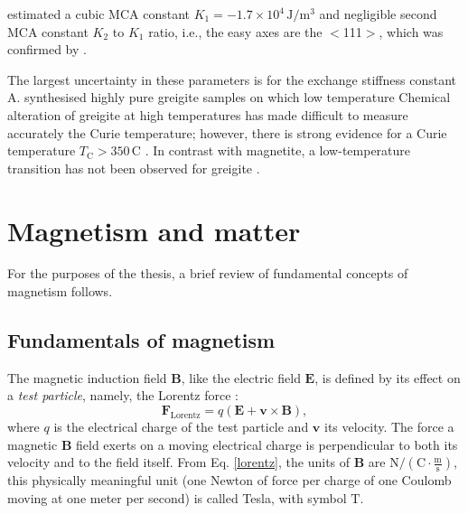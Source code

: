 \citet{Winklhofer2014} estimated a cubic MCA constant $K_1=-1.7\times10^4\,\text{J}/\text{m}^3$ and negligible second MCA constant $K_2$ to $K_1$ ratio, i.e., the easy axes are the $<$111$>$, which was confirmed by \citet{Li2014}.\par
The largest uncertainty in these parameters is for the exchange stiffness constant A. \citet{Chang2008} synthesised highly pure greigite samples on which low temperature
Chemical alteration of greigite at high temperatures has made difficult to measure accurately the Curie temperature; however, there is strong evidence for a Curie temperature $T_\text{C}>350\,\text{C}$ \citep{Roberts2010}. In contrast with magnetite, a low-temperature transition has not been observed for greigite \citep{Roberts2010}.\par

\section{Magnetism and matter}
For the purposes of the thesis, a brief review of fundamental concepts of magnetism follows.\par
 
\subsection{Fundamentals of magnetism}
The magnetic induction field $\boldsymbol{B}$, like the electric field $\boldsymbol{E}$, is defined by its effect on a \textit{test particle}, namely, the Lorentz force \citep{Feynman}:
\begin{equation}\label{lorentz}
\boldsymbol{F}_\text{Lorentz} = q(\boldsymbol{E} + \boldsymbol{v}\times\boldsymbol{B}),
\end{equation}
where $q$ is the electrical charge of the test particle and $\boldsymbol{v}$ its velocity. The force a magnetic $\boldsymbol{B}$ field exerts on a moving electrical charge is perpendicular to both its velocity and to the field itself. From Eq. \ref{lorentz}, the units of $\boldsymbol{B}$ are $\text{N}/(\text{C}\cdot\frac{\text{m}}{\text{s}})$, this physically meaningful unit (one Newton of force per charge of one Coulomb moving at one meter per second) is called Tesla, with symbol $\text{T}$.\par

